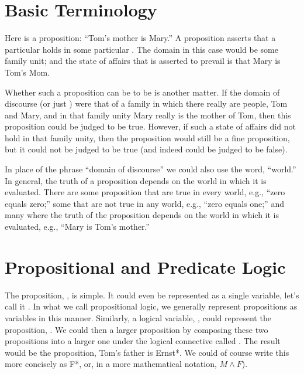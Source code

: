 \documentclass[letterpaper,10pt,english]{sphinxmanual}
\begin{document}
\section{Basic Terminology}
\label{\detokenize{09-propositional-logic:basic-terminology}}
Here is a proposition: “Tom’s mother is Mary.” A proposition asserts
that a particular  holds in some particular . The domain in this case would be some family unit; and
the state of affairs that is asserted to prevail is that Mary is Tom’s
Mom.

Whether such a proposition can be  to be  is another
matter. If the domain of discourse (or just ) were that of a
family in which there really are people, Tom and Mary, and in that
family unity Mary really is the mother of Tom, then this proposition
could be judged to be true. However, if such a state of affairs did
not hold in that family unity, then the proposition would still be a
fine proposition, but it could not be judged to be true (and indeed
could be judged to be false).

In place of the phrase “domain of discourse” we could also use the
word, “world.” In general, the truth of a proposition depends on the
world in which it is evaluated. There are some proposition that are
true in every world, e.g., “zero equals zero;” some that are not true
in any world, e.g., “zero equals one;” and many where the truth of the
proposition depends on the world in which it is evaluated, e.g., “Mary
is Tom’s mother.”


\section{Propositional and Predicate Logic}
\label{\detokenize{09-propositional-logic:propositional-and-predicate-logic}}
The proposition, , is simple. It could even be
represented as a single variable, let’s call it .  In what we call
propositional logic, we generally represent propositions as variables
in this manner. Similarly, a logical variable, , could represent
the proposition, .  We could then  a
larger proposition by composing these two propositions into a larger
one under the logical connective called . The result would be the
proposition,  Tom’s father is Ernst*. We
could of course write this more concisely as  F*, or, in a
more mathematical notation, \(M \land F\)).
\end{document}
